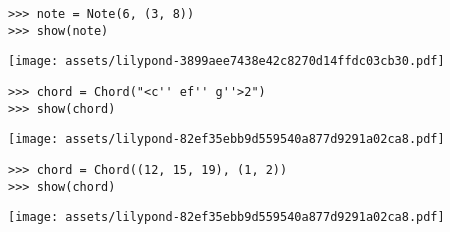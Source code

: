 \begin{comment}
<abjad>
note = Note(6, (3, 8))
show(note)
</abjad>
\end{comment}

\begin{abjadbookoutput}
\begin{singlespacing}
\vspace{-0.5\baselineskip}
\begin{lstlisting}
>>> note = Note(6, (3, 8))
>>> show(note)
\end{lstlisting}
\noindent\texttt{[image: assets/lilypond-3899aee7438e42c8270d14ffdc03cb30.pdf]}
\end{singlespacing}
\end{abjadbookoutput}

\begin{comment}
<abjad>
chord = Chord("<c'' ef'' g''>2")
show(chord)
</abjad>
\end{comment}

\begin{abjadbookoutput}
\begin{singlespacing}
\vspace{-0.5\baselineskip}
\begin{lstlisting}
>>> chord = Chord("<c'' ef'' g''>2")
>>> show(chord)
\end{lstlisting}
\noindent\texttt{[image: assets/lilypond-82ef35ebb9d559540a877d9291a02ca8.pdf]}
\end{singlespacing}
\end{abjadbookoutput}

\begin{comment}
<abjad>
chord = Chord((12, 15, 19), (1, 2))
show(chord)
</abjad>
\end{comment}

\begin{abjadbookoutput}
\begin{singlespacing}
\vspace{-0.5\baselineskip}
\begin{lstlisting}
>>> chord = Chord((12, 15, 19), (1, 2))
>>> show(chord)
\end{lstlisting}
\noindent\texttt{[image: assets/lilypond-82ef35ebb9d559540a877d9291a02ca8.pdf]}
\end{singlespacing}
\end{abjadbookoutput}

\begin{comment}
<abjad>
rest = Rest("r4")
show(rest)
</abjad>
\end{comment}

